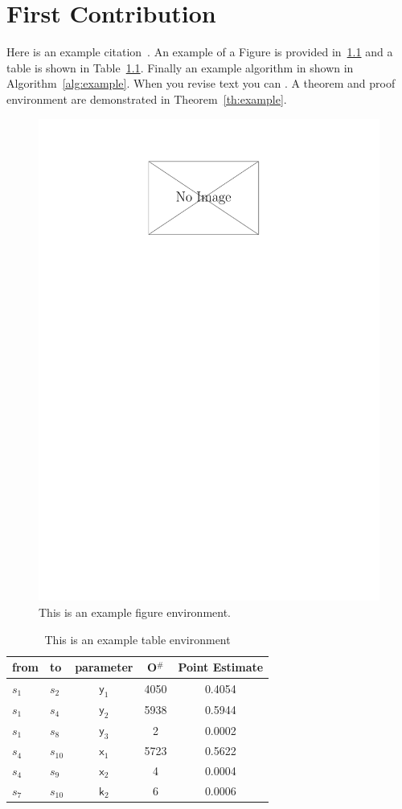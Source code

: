 \chapter{First Contribution\label{chap:Contribution1}}

\lipsum[8-9]

Here is an example citation~\cite{OMNIref}. An example of a Figure is provided in~\ref{fig:ExampleFigure} and a table is shown in Table~\ref{tab:Example}. Finally an example algorithm in shown in Algorithm~\ref{alg:example}. When you revise text you can . A theorem and proof environment are demonstrated in Theorem~\ref{th:example}.


\begin{figure}
	\centering
	\includegraphics[width=0.5\linewidth]{images/NoImage.pdf}
	\caption{This is an example figure environment.\label{fig:ExampleFigure}}
\end{figure}

\begin{table}[t]
	\sffamily
	\caption{This is an example table environment\label{tab:Example}}
	\centering
	\begin{tabular}{llccc} \toprule
		from & to & parameter & O$^{\#}$ & Point Estimate\\ \midrule
		$s_1$ & $s_2$ & $\textsf{y}_1$ & 4050  & 0.4054\\
		$s_1$ & $s_4$ & $\textsf{y}_2$ & 5938 & 0.5944\\
		$s_1$ & $s_8$ & $\textsf{y}_3$ & 2 & 0.0002 \\ \midrule
		$s_4$ & $s_{10}$ & $\textsf{x}_1$ & 5723 & 0.5622\\
		$s_4$ & $s_9$ & $\textsf{x}_2$ & 4 & 0.0004\\
		$s_7$ & $s_{10}$ & $\textsf{k}_2$ & 6 & 0.0006\\ \bottomrule
	\end{tabular}
\end{table}



